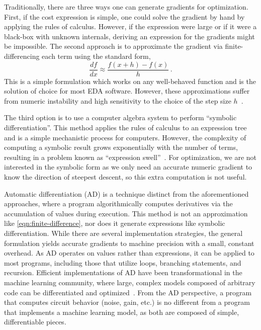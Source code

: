 Traditionally, there are three ways one can generate gradients for optimization.
First, if the cost expression is simple, one could solve the gradient by hand by applying the rules of calculus.
However, if the expression were large or if it were a black-box with unknown internals, deriving an expression for the gradients might be impossible.
The second approach is to approximate the gradient via finite-differencing each term using the standard form,
%
\begin{equation}
	\frac{df}{dx} \approx \frac{f(x+h)-f(x)}{h} \,.
	\label{eqn:finite-difference}
\end{equation}
%
This is a simple formulation which works on any well-behaved function and is the solution of choice for most EDA software.
However, these approximations suffer from numeric instability and high sensitivity to the choice of the step size $h$~\cite{jerrellAutomaticDifferentiationInterval1997}.

The third option is to use a computer algebra system to perform ``symbolic differentiation''.
This method applies the rules of calculus to an expression tree and is a simple mechanistic process for computers.
However, the complexity of computing a symbolic result grows exponentially with the number of terms, resulting in a problem known as ``expression swell''~\cite{corlissApplicationsDifferentiationArithmetic11988}.
For optimization, we are not interested in the symbolic form as we only need an accurate numeric gradient to know the direction of steepest descent, so this extra computation is not useful.

Automatic differentiation (AD) is a technique distinct from the aforementioned approaches, where a program algorithmically computes derivatives via the accumulation of values during execution.
This method is not an approximation like \eqref{eqn:finite-difference}, nor does it generate expressions like symbolic differentiation.
While there are several implementation strategies, the general formulation yields accurate gradients to machine precision with a small, constant overhead.
As AD operates on values rather than expressions, it can be applied to most programs, including those that utilize loops, branching statements, and recursion.
Efficient implementations of AD have been transformational in the machine learning community, where large, complex models composed of arbitrary code can be differentiated and optimized~\cite{pytorch}.
From the AD perspective, a program that computes circuit behavior (noise, gain, etc.) is no different from a program that implements a machine learning model, as both are composed of simple, differentiable pieces.

